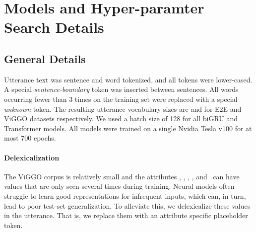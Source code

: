 \section{Models and Hyper-paramter Search Details}
\label{app:hps}

\subsection{General Details}

Utterance text was sentence and word tokenized, and all tokens were
lower-cased. A special \textit{sentence-boundary} token was inserted between
sentences. All words occurring fewer than 3 times on the training set were
replaced with a special \textit{unknown} token.  The resulting utterance
vocabulary sizes are  and  for E2E and ViGGO
datasets respectively.  We used a batch size of 128 for all biGRU and
Transformer models.  All models were trained on a single Nvidia Tesla v100 for
at most 700 epochs.

\paragraph{Delexicalization} The ViGGO corpus is relatively small and the
attributes , , ,
, and ~can have values that are
only seen several times during training. Neural models often struggle to learn
good representations for infrequent inputs, which can, in turn, lead to poor
test-set generalization. To alleviate this, we delexicalize these values in
the utterance. That is, we replace them with an attribute specific placeholder
token.

